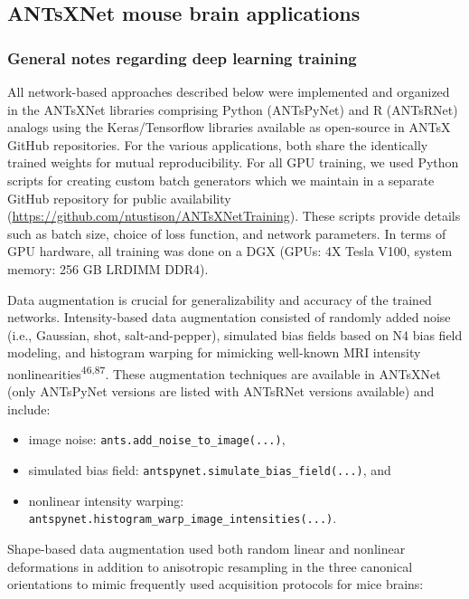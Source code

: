\documentclass[
  12pt,
]{article}
\begin{document}
\subsection{ANTsXNet mouse brain
applications}\label{antsxnet-mouse-brain-applications}

\subsubsection{General notes regarding deep learning
training}\label{general-notes-regarding-deep-learning-training}

All network-based approaches described below were implemented and
organized in the ANTsXNet libraries comprising Python (ANTsPyNet) and R
(ANTsRNet) analogs using the Keras/Tensorflow libraries available as
open-source in ANTsX GitHub repositories. For the various applications,
both share the identically trained weights for mutual reproducibility.
For all GPU training, we used Python scripts for creating custom batch
generators which we maintain in a separate GitHub repository for public
availability (\url{https://github.com/ntustison/ANTsXNetTraining}).
These scripts provide details such as batch size, choice of loss
function, and network parameters. In terms of GPU hardware, all training
was done on a DGX (GPUs: 4X Tesla V100, system memory: 256 GB LRDIMM
DDR4).

Data augmentation is crucial for generalizability and accuracy of the
trained networks. Intensity-based data augmentation consisted of
randomly added noise (i.e., Gaussian, shot, salt-and-pepper), simulated
bias fields based on N4 bias field modeling, and histogram warping for
mimicking well-known MRI intensity
nonlinearities\textsuperscript{46,87}. These augmentation techniques are
available in ANTsXNet (only ANTsPyNet versions are listed with ANTsRNet
versions available) and include:

\begin{itemize}
\item
  image noise: \texttt{ants.add\_noise\_to\_image(...)},
\item
  simulated bias field: \texttt{antspynet.simulate\_bias\_field(...)},
  and
\item
  nonlinear intensity warping:
  \texttt{antspynet.histogram\_warp\_image\_intensities(...)}.
\end{itemize}

Shape-based data augmentation used both random linear and nonlinear
deformations in addition to anisotropic resampling in the three
canonical orientations to mimic frequently used acquisition protocols
for mice brains:
\end{document}
